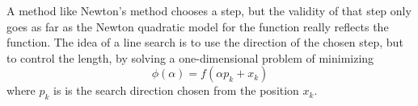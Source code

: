  A method like Newton's method chooses a step, but the validity of that step only goes as far as the Newton quadratic model for the function really reflects the function. The idea of a line search is to use the direction of the chosen step, but to control the length, by solving a one-dimensional problem of minimizing
\[
\phi(\alpha) = f(\alpha p_k + x_k)
\]
where $p_k$ is is the search direction chosen from the position $x_k$.



 



















